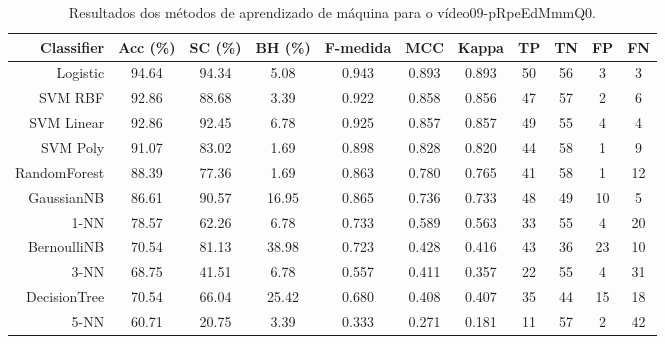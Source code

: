 \begin{table}[!htb]
\centering
\caption{Resultados dos métodos de aprendizado de máquina para o vídeo09-pRpeEdMmmQ0.}
\label{tab:09-pRpeEdMmmQ0}
\begin{tabular}{r|c|c|c|c|c|c|c|c|c|c}
\hline\hline
Classifier & Acc (\%) & SC (\%) & BH (\%) & F-medida & MCC & Kappa & TP & TN & FP & FN \\ \hline
Logistic & 94.64 & 94.34 & 5.08 & 0.943 & 0.893 & 0.893 & 50 & 56 & 3 & 3 \\ 
SVM RBF & 92.86 & 88.68 & 3.39 & 0.922 & 0.858 & 0.856 & 47 & 57 & 2 & 6 \\ 
SVM Linear & 92.86 & 92.45 & 6.78 & 0.925 & 0.857 & 0.857 & 49 & 55 & 4 & 4 \\ 
SVM Poly & 91.07 & 83.02 & 1.69 & 0.898 & 0.828 & 0.820 & 44 & 58 & 1 & 9 \\ 
RandomForest & 88.39 & 77.36 & 1.69 & 0.863 & 0.780 & 0.765 & 41 & 58 & 1 & 12 \\ 
GaussianNB & 86.61 & 90.57 & 16.95 & 0.865 & 0.736 & 0.733 & 48 & 49 & 10 & 5 \\ 
1-NN & 78.57 & 62.26 & 6.78 & 0.733 & 0.589 & 0.563 & 33 & 55 & 4 & 20 \\ 
BernoulliNB & 70.54 & 81.13 & 38.98 & 0.723 & 0.428 & 0.416 & 43 & 36 & 23 & 10 \\ 
3-NN & 68.75 & 41.51 & 6.78 & 0.557 & 0.411 & 0.357 & 22 & 55 & 4 & 31 \\ 
DecisionTree & 70.54 & 66.04 & 25.42 & 0.680 & 0.408 & 0.407 & 35 & 44 & 15 & 18 \\ 
5-NN & 60.71 & 20.75 & 3.39 & 0.333 & 0.271 & 0.181 & 11 & 57 & 2 & 42 \\ 
\hline\hline
\end{tabular}
\end{table}
